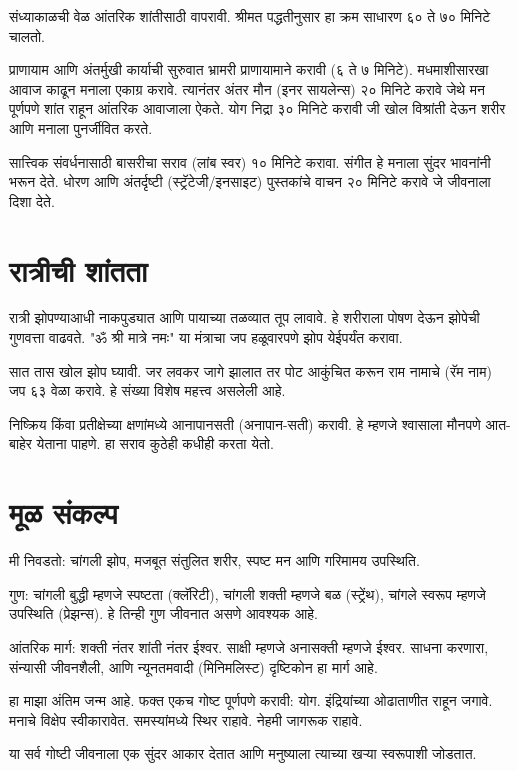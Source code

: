 संध्याकाळची वेळ आंतरिक शांतीसाठी वापरावी. श्रीमत पद्धतीनुसार हा क्रम साधारण ६० ते ७० मिनिटे चालतो.

प्राणायाम आणि अंतर्मुखी कार्याची सुरुवात भ्रामरी प्राणायामाने करावी (६ ते ७ मिनिटे). मधमाशीसारखा आवाज काढून मनाला एकाग्र करावे. त्यानंतर अंतर मौन (इनर सायलेन्स) २० मिनिटे करावे जेथे मन पूर्णपणे शांत राहून आंतरिक आवाजाला ऐकते. योग निद्रा ३० मिनिटे करावी जी खोल विश्रांती देऊन शरीर आणि मनाला पुनर्जीवित करते.

सात्त्विक संवर्धनासाठी बासरीचा सराव (लांब स्वर) १० मिनिटे करावा. संगीत हे मनाला सुंदर भावनांनी भरून देते. धोरण आणि अंतर्दृष्टी (स्ट्रॅटेजी/इनसाइट) पुस्तकांचे वाचन २० मिनिटे करावे जे जीवनाला दिशा देते.

\section*{रात्रीची शांतता}

रात्री झोपण्याआधी नाकपुड्यात आणि पायाच्या तळव्यात तूप लावावे. हे शरीराला पोषण देऊन झोपेची गुणवत्ता वाढवते. "ॐ श्री मात्रे नमः" या मंत्राचा जप हळूवारपणे झोप येईपर्यंत करावा.

सात तास खोल झोप घ्यावी. जर लवकर जागे झालात तर पोट आकुंचित करून राम नामाचे (रॅम नाम) जप ६३ वेळा करावे. हे संख्या विशेष महत्त्व असलेली आहे.

निष्क्रिय किंवा प्रतीक्षेच्या क्षणांमध्ये आनापानसती (अनापान-सती) करावी. हे म्हणजे श्वासाला मौनपणे आत-बाहेर येताना पाहणे. हा सराव कुठेही कधीही करता येतो.

\section*{मूळ संकल्प}

मी निवडतो: चांगली झोप, मजबूत संतुलित शरीर, स्पष्ट मन आणि गरिमामय उपस्थिति.

गुण: चांगली बुद्धी म्हणजे स्पष्टता (क्लॅरिटी), चांगली शक्ती म्हणजे बळ (स्ट्रेंथ), चांगले स्वरूप म्हणजे उपस्थिति (प्रेझन्स). हे तिन्ही गुण जीवनात असणे आवश्यक आहे.

आंतरिक मार्ग: शक्ती नंतर शांती नंतर ईश्वर. साक्षी म्हणजे अनासक्ती म्हणजे ईश्वर. साधना करणारा, संन्यासी जीवनशैली, आणि न्यूनतमवादी (मिनिमलिस्ट) दृष्टिकोन हा मार्ग आहे.

हा माझा अंतिम जन्म आहे. फक्त एकच गोष्ट पूर्णपणे करावी: योग. इंद्रियांच्या ओढाताणीत राहून जगावे. मनाचे विक्षेप स्वीकारावेत. समस्यांमध्ये स्थिर राहावे. नेहमी जागरूक राहावे.

या सर्व गोष्टी जीवनाला एक सुंदर आकार देतात आणि मनुष्याला त्याच्या खऱ्या स्वरूपाशी जोडतात.